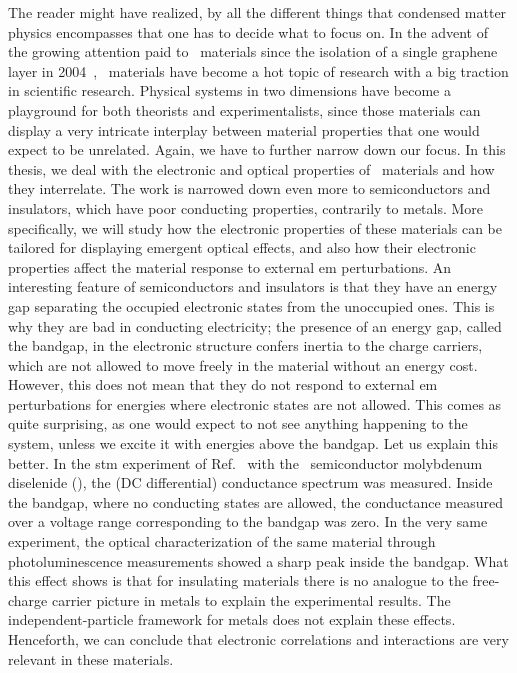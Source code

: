 The reader might have realized, by all the different things that condensed matter physics encompasses that one has to decide what to focus on.
In the advent of the growing attention paid to \bd~materials since the isolation of a single graphene layer in 2004~\cite{Novoselov_Geim_2004}, \bd~materials have become a hot topic of research with a big traction in scientific research.
Physical systems in two dimensions have become a playground for both theorists and experimentalists, since those materials can display a very intricate interplay between material properties that one would expect to be unrelated.
Again, we have to further narrow down our focus.
In this thesis, we deal with the electronic and optical properties of \bd~materials and how they interrelate.
The work is narrowed down even more to semiconductors and insulators, which have poor conducting properties, contrarily to metals.
More specifically, we will study how the electronic properties of these materials can be tailored for displaying emergent optical effects, and also how their electronic properties affect the material response to external \gls{em} perturbations.
An interesting feature of semiconductors and insulators is that they have an energy gap separating the occupied electronic states from the unoccupied ones.
This is why they are bad in conducting electricity; the presence of an energy gap, called the bandgap, in the electronic structure confers inertia to the charge carriers, which are not allowed to move freely in the material without an energy cost.
However, this does not mean that they do not respond to external \gls{em} perturbations for energies where electronic states are not allowed.
This comes as quite surprising, as one would expect to not see anything happening to the system, unless we excite it with energies above the bandgap.
Let us explain this better.
In the \gls{stm} experiment of Ref.~\cite{da_Jornada_Zhang_2014} with the \bd~semiconductor molybdenum diselenide (), the (DC differential) conductance spectrum was measured.
Inside the bandgap, where no conducting states are allowed, the conductance measured over a voltage range corresponding to the bandgap was zero.
In the very same experiment, the optical characterization of the same material through photoluminescence measurements showed a sharp peak inside the bandgap.
What this effect shows is that for insulating materials there is no analogue to the free-charge carrier picture in metals to explain the experimental results.
The independent-particle framework for metals does not explain these effects.
Henceforth, we can conclude that electronic correlations and interactions are very relevant in these materials.

